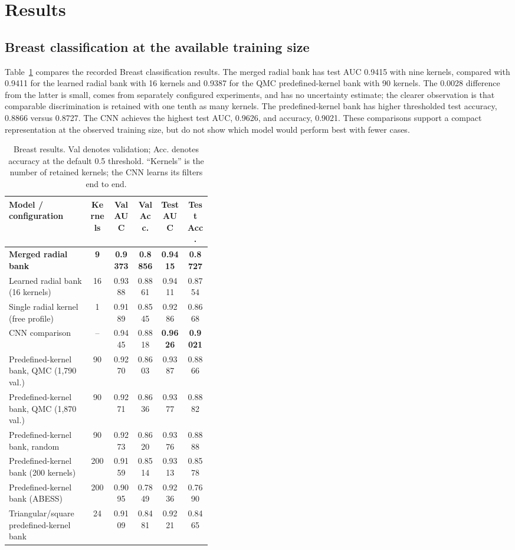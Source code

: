 \documentclass[10pt,twocolumn]{article}
\begin{document}
\section{Results}
\subsection{Breast classification at the available training size}
Table~\ref{tab:main-results} compares the recorded Breast classification results. The merged radial bank has test AUC 0.9415 with nine kernels, compared with 0.9411 for the learned radial bank with 16 kernels and 0.9387 for the QMC predefined-kernel bank with 90 kernels. The 0.0028 difference from the latter is small, comes from separately configured experiments, and has no uncertainty estimate; the clearer observation is that comparable discrimination is retained with one tenth as many kernels. The predefined-kernel bank has higher thresholded test accuracy, 0.8866 versus 0.8727. The CNN achieves the highest test AUC, 0.9626, and accuracy, 0.9021. These comparisons support a compact representation at the observed training size, but do not show which model would perform best with fewer cases.

\begin{table}[!t]
\centering
\caption{Breast results. Val denotes validation; Acc. denotes accuracy at the default 0.5 threshold. ``Kernels'' is the number of retained kernels; the CNN learns its filters end to end.}
\label{tab:main-results}
\small
\begin{tabular}{p{0.40\linewidth}ccccc}
\toprule
Model / configuration & Kernels & Val AUC & Val Acc. & Test AUC & Test Acc.\\
\midrule
\textbf{Merged radial bank} & \textbf{9} & \textbf{0.9373} & \textbf{0.8856} & \textbf{0.9415} & \textbf{0.8727}\\
Learned radial bank (16 kernels) & 16 & 0.9388 & 0.8861 & 0.9411 & 0.8754\\
Single radial kernel (free profile) & 1 & 0.9189 & 0.8545 & 0.9286 & 0.8668\\
CNN comparison & -- & 0.9445 & 0.8818 & \textbf{0.9626} & \textbf{0.9021}\\
Predefined-kernel bank, QMC (1,790 val.) & 90 & 0.9270 & 0.8603 & 0.9387 & 0.8866\\
Predefined-kernel bank, QMC (1,870 val.) & 90 & 0.9271 & 0.8636 & 0.9377 & 0.8882\\
Predefined-kernel bank, random & 90 & 0.9273 & 0.8620 & 0.9376 & 0.8888\\
Predefined-kernel bank (200 kernels) & 200 & 0.9159 & 0.8514 & 0.9313 & 0.8578\\
Predefined-kernel bank (ABESS) & 200 & 0.9095 & 0.7849 & 0.9236 & 0.7690\\
Triangular/square predefined-kernel bank & 24 & 0.9109 & 0.8481 & 0.9221 & 0.8465\\
\bottomrule
\end{tabular}
\end{table}
\end{document}
